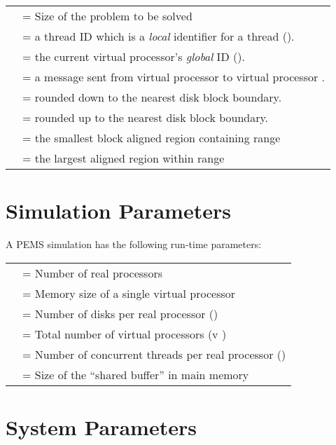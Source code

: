 \documentclass[12pt]{carletoncsthesis}
\begin{document}
\begin{center}
\begin{tabular}[ht]{ll}
 & = Size of the problem to be solved \\

 & = a thread ID which is a {\em local} identifier for a thread
(). \\

 & = the current virtual processor's {\em global} ID (). \\

 & = a message sent from virtual processor  to
virtual processor . \\

 & =  rounded down to the nearest disk block boundary. \\

 & =  rounded up to the nearest disk block boundary. \\

 & = the smallest block aligned region containing range  \\

 & = the largest aligned region within range  \\

\end{tabular}
\end{center}

\section{Simulation Parameters}


A PEMS simulation has the following run-time parameters:

\begin{center}
\begin{tabular}[ht]{ll}
      & = Number of real processors \\
    & = Memory size of a single virtual processor \\
      & = Number of disks per real processor () \\
      & = Total number of virtual processors (v ) \\
      & = Number of concurrent threads per real processor () \\
 & = Size of the ``shared buffer'' in main memory
\end{tabular}
\end{center}

\section{System Parameters}
\label{parameters}
\end{document}

